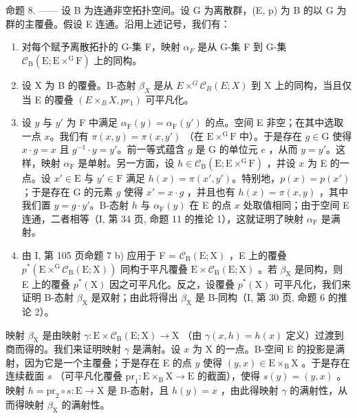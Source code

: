 命题 8. —— 设 B 为连通非空拓扑空间。设 G 为离散群，(E, p) 为 B 的以 G 为群的主覆叠。假设 E 连通。沿用上述记号，我们有：

\begin{enumerate}
\def\labelenumi{\alph{enumi})}
\item
  对每个赋予离散拓扑的 G-集 F，映射 \(\alpha_{F}\) 是从 G-集 F 到 G-集 \(\mathcal{C}_{\mathrm{B}}(\mathrm{E};\mathrm{E}\times^{\mathrm{G}}\mathrm{F})\) 上的同构。
\item
  设 X 为 B 的覆叠。B-态射 \(\beta_{X}\) 是从 \(E \times^{G} \mathcal{C}_{B}(E; X)\) 到 X 上的同构，当且仅当 E 的覆叠 \((E \times_{B} X, pr_{1})\) 可平凡化。
\item
  设 \(y\) 与 \(y'\) 为 F 中满足 \(\alpha_{\mathrm{F}}(y) = \alpha_{\mathrm{F}}(y')\) 的点。空间 E 非空；在其中选取一点 \(x\)。我们有 \(\pi(x, y) = \pi(x, y')\) （在 \(\mathrm{E} \times^{\mathrm{G}} \mathrm{F}\) 中）。于是存在 \(g \in \mathrm{G}\) 使得 \(x \cdot g = x\) 且 \(g^{-1} \cdot y = y'\)。前一等式蕴含 \(g\) 是 G 的单位元 \(e\) ，从而 \(y = y'\)。这样，映射 \(\alpha_{\mathrm{F}}\) 是单射。另一方面，设 \(h \in \mathcal{C}_{\mathrm{B}}(\mathrm{E}; \mathrm{E} \times^{\mathrm{G}} \mathrm{F})\) ，并设 \(x\) 为 E 的一点。设 \(x' \in \mathrm{E}\) 与 \(y' \in \mathrm{F}\) 满足 \(h(x) = \pi(x', y')\)。特别地，\(p(x) = p(x')\)；于是存在 G 的元素 \(g\) 使得 \(x' = x \cdot g\) ，并且也有 \(h(x) = \pi(x, y)\) ，其中我们置 \(y = g \cdot y'\)。B-态射 \(h\) 与 \(\alpha_{\mathrm{F}}(y)\) 在 E 的点 \(x\) 处取值相同；由于空间 E 连通，二者相等（I, 第 34 页, 命题 11 的推论 1），这就证明了映射 \(\alpha_{\mathrm{F}}\) 是满射。
\item
  由 I, 第 105 页命题 7 b) 应用于 F = \(\mathcal{C}_{\mathrm{B}}(\mathrm{E};\mathrm{X})\) ，E 上的覆叠 \(p^{*}(\mathrm{E}\times^{\mathrm{G}}\mathcal{C}_{\mathrm{B}}(\mathrm{E};\mathrm{X}))\) 同构于平凡覆叠 \(\mathrm{E}\times \mathcal{C}_{\mathrm{B}}(\mathrm{E};\mathrm{X})\) 。若 \(\beta_{\mathrm{X}}\) 是同构，则 E 上的覆叠 \(p^{*}(\mathrm{X})\) 因之可平凡化。反之，设覆叠 \(p^{*}(\mathrm{X})\) 可平凡化，我们来证明 B-态射 \(\beta_{\mathrm{X}}\) 是双射；由此将得出 \(\beta_{\mathrm{X}}\) 是 B-同构（I, 第 30 页, 命题 6 的推论 2）。
\end{enumerate}

映射 \(\beta_{\mathrm{X}}\) 是由映射 \(\gamma\colon\mathrm{E}\times\mathcal{C}_{\mathrm{B}}(\mathrm{E};\mathrm{X})\to\mathrm{X}\) （由 \(\gamma(x,h)=h(x)\) 定义）过渡到商而得的。我们来证明映射 \(\gamma\) 是满射。设 \(x\) 为 X 的一点。B-空间 E 的投影是满射，因为它是一个主覆叠；于是存在 E 的点 \(y\) 使得 \((y,x)\in\mathrm{E}\times_{\mathrm{B}}\mathrm{X}\) 。于是存在连续截面 \(s\) （可平凡化覆叠 \(\mathrm{pr}_{1}:\mathrm{E}\times_{\mathrm{B}}\mathrm{X}\to\mathrm{E}\) 的截面），使得 \(s(y)=(y,x)\) 。映射 \(h=\mathrm{pr}_{2}\circ s:\mathrm{E}\to\mathrm{X}\) 是 B-态射，且 \(h(y)=x\) ，由此得映射 \(\gamma\) 的满射性，从而得映射 \(\beta_{\mathrm{X}}\) 的满射性。

